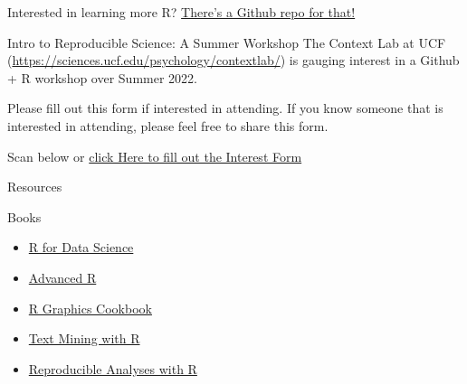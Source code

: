 \documentclass[
  ignorenonframetext,
]{beamer}
\providecommand{\tightlist}{%
  \setlength{\itemsep}{0pt}\setlength{\parskip}{0pt}}
\begin{document}
\begin{frame}{Interested in learning more R?}
\protect\hypertarget{interested-in-learning-more-r}{}
\href{https://github.com/nelsonroque/contextlab_intro_datascience}{There's
a Github repo for that!}
\end{frame}

\begin{frame}{Intro to Reproducible Science: A Summer Workshop}
\protect\hypertarget{intro-to-reproducible-science-a-summer-workshop}{}
The Context Lab at UCF
(\url{https://sciences.ucf.edu/psychology/contextlab/}) is gauging
interest in a Github + R workshop over Summer 2022.

Please fill out this form if interested in attending. If you know
someone that is interested in attending, please feel free to share this
form.

Scan below or \href{https://forms.office.com/r/8j6QarEHwa}{click Here to
fill out the Interest Form}
\end{frame}

\begin{frame}{Resources}
\protect\hypertarget{resources}{}
\begin{block}{Books}
\protect\hypertarget{books}{}
\begin{itemize}
\tightlist
\item
  \href{https://r4ds.had.co.nz/}{R for Data Science}
\item
  \href{https://adv-r.hadley.nz/index.html}{Advanced R}
\item
  \href{http://www.cookbook-r.com/}{R Graphics Cookbook}
\item
  \href{https://www.tidytextmining.com/}{Text Mining with R}
\item
  \href{https://nceas.github.io/sasap-training/materials/reproducible_research_in_r_fairbanks/}{Reproducible
  Analyses with R}
\end{itemize}
\end{block}
\end{frame}
\end{document}

